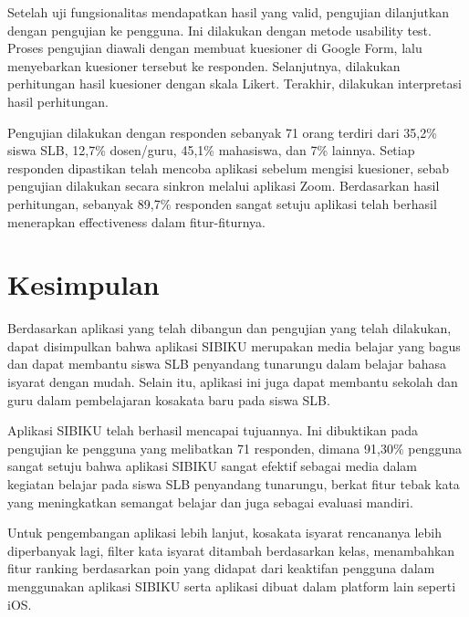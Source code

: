 \documentclass[conference,a4paper,10pt]{IEEEtran}
\begin{document}
Setelah uji fungsionalitas mendapatkan hasil yang valid, pengujian dilanjutkan
dengan pengujian ke pengguna. Ini dilakukan dengan metode usability test. Proses
pengujian diawali dengan membuat kuesioner di Google Form, lalu menyebarkan
kuesioner tersebut ke responden. Selanjutnya, dilakukan perhitungan hasil
kuesioner dengan skala Likert. Terakhir, dilakukan interpretasi hasil perhitungan.

Pengujian dilakukan dengan responden sebanyak 71 orang terdiri dari 35,2\% siswa
SLB, 12,7\% dosen/guru, 45,1\% mahasiswa, dan 7\% lainnya. Setiap responden
dipastikan telah mencoba aplikasi sebelum mengisi kuesioner, sebab pengujian
dilakukan secara sinkron melalui aplikasi Zoom. Berdasarkan hasil perhitungan,
sebanyak 89,7\% responden sangat setuju aplikasi telah berhasil menerapkan
effectiveness dalam fitur-fiturnya.

\section{Kesimpulan}
Berdasarkan aplikasi yang telah dibangun dan pengujian yang telah dilakukan,
dapat disimpulkan bahwa aplikasi SIBIKU merupakan media belajar yang bagus dan
dapat membantu siswa SLB penyandang tunarungu dalam belajar bahasa isyarat
dengan mudah. Selain itu, aplikasi ini juga dapat membantu sekolah dan guru
dalam pembelajaran kosakata baru pada siswa SLB.

Aplikasi SIBIKU telah berhasil mencapai tujuannya. Ini dibuktikan pada pengujian
ke pengguna yang melibatkan 71 responden, dimana 91,30\% pengguna sangat setuju
bahwa aplikasi SIBIKU sangat efektif sebagai media dalam kegiatan belajar pada
siswa SLB penyandang tunarungu, berkat fitur tebak kata yang meningkatkan
semangat belajar dan juga sebagai evaluasi mandiri.

Untuk pengembangan aplikasi lebih lanjut, kosakata isyarat rencananya lebih
diperbanyak lagi, filter kata isyarat ditambah berdasarkan kelas, menambahkan
fitur ranking berdasarkan poin yang didapat dari keaktifan pengguna dalam
menggunakan aplikasi SIBIKU serta aplikasi dibuat dalam platform lain seperti
iOS.
\end{document}

